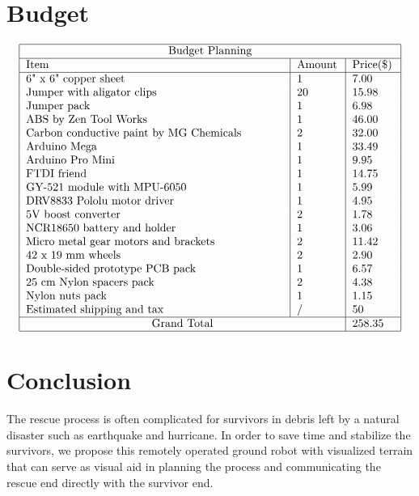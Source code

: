 \documentclass[a4paper,12pt]{article}
\begin{document}
\section{Budget}
$$
\begin{tabular}{ |p{8cm}|p{1.3cm}|p{1.3cm}|  }
	\hline
		\multicolumn{3}{|c|}{Budget Planning} \\
	\hline
		 Item & Amount & Price(\$) \\
	\hline
		 6" x 6" copper sheet					& 	1	&	7.00\\
		 Jumper with aligator clips				&	20	&	15.98\\
		 Jumper	pack								&	1	&	6.98\\
		 ABS by Zen Tool Works					&	1	&	46.00\\
		 Carbon conductive paint by MG Chemicals	&	2	&	32.00\\
		 Arduino Mega							&	1	&	33.49\\
		 Arduino Pro Mini						&	1	&	9.95\\
		 FTDI friend								&	1	&	14.75\\
		 GY-521 module with MPU-6050				&	1	&	5.99\\
		 DRV8833 Pololu motor driver				&	1	&	4.95\\
		 5V boost converter						&	2	&	1.78\\
		 NCR18650 battery and holder				&	1	&	3.06\\
		 Micro metal gear motors and brackets	&	2	&	11.42\\
		 42 x 19 mm wheels						&	2	&	2.90\\
		 Double-sided prototype PCB pack			&	1	&	6.57\\
		 25 cm Nylon spacers pack					&	2	&	4.38\\
		 Nylon nuts pack							&	1	&	1.15\\
		 Estimated shipping and tax				&	/	&	50\\
	\hline
		\multicolumn{2}{|c|}{Grand Total}	& 258.35\\
	\hline
\end{tabular}
$$

\section{Conclusion}
The rescue process is often complicated for survivors in debris left by a natural disaster such as earthquake and hurricane. In order to save time and stabilize the survivors, we propose this remotely operated ground robot with visualized terrain that can serve as visual aid in planning the process and communicating the rescue end directly with the survivor end.



\medskip



\end{document}
